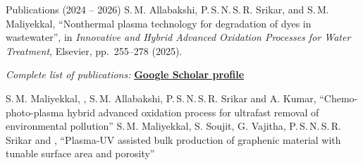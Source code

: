 \begin{rubric}{Publications (2024 -- 2026)}
\entry*[] \small S.\,M. Allabakshi, P.\,S.\,N.\,S.\,R. Srikar,  and S.\,M. Maliyekkal,
  ``Nonthermal plasma technology for degradation of dyes in wastewater'',
  in \emph{Innovative and Hybrid Advanced Oxidation Processes for Water Treatment}, Elsevier, pp.\ 255--278 (2025). 

\entry*[] \textit{Complete list of publications:}
\href{https://scholar.google.co.in/citations?user=r6HvPAsAAAAJ&hl=en}{\textcolor{MarkerColour}{\textbf{Google Scholar profile}}}

\entry*[] \small S.\,M. Maliyekkal, , S.\,M. Allabakshi, P.\,S.\,N.\,S.\,R. Srikar and A. Kumar,
  ``Chemo-photo-plasma hybrid advanced oxidation process for ultrafast removal of environmental pollution'' 
\entry*[] \small S.\,M. Maliyekkal, S. Soujit, G. Vajitha, P.\,S.\,N.\,S.\,R. Srikar and ,
  ``Plasma-UV assisted bulk production of graphenic material with tunable surface area and porosity'' 
\end{rubric}
